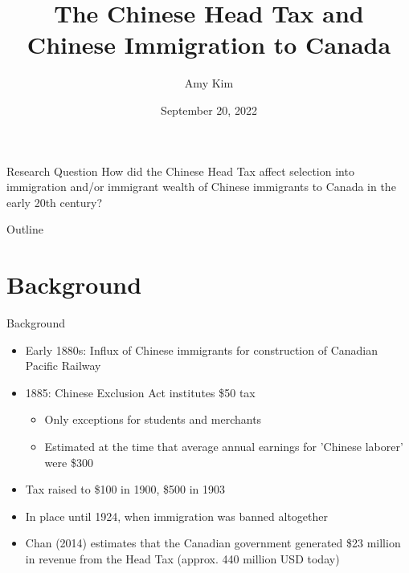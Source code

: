 \documentclass[pdf]{beamer}
\title{The Chinese Head Tax and Chinese Immigration to Canada}
\author{Amy Kim}
\date{September 20, 2022}
\begin{document}
\begin{frame}
    \titlepage
\end{frame}

\begin{frame}{Research Question}
    How did the Chinese Head Tax affect selection into immigration and/or immigrant wealth of Chinese immigrants to Canada in the early 20th century?    
\end{frame}

\begin{frame}{Outline}
    \tableofcontents
\end{frame}


\section{Background}
\begin{frame}{Background}
    \begin{itemize}
        \item Early 1880s: Influx of Chinese immigrants for construction of Canadian Pacific Railway
        \item 1885: Chinese Exclusion Act institutes \$50 tax
        \begin{itemize}
            \item Only exceptions for students and merchants
            \item Estimated at the time that average annual earnings for 'Chinese laborer' were \$300
        \end{itemize}
        \item Tax raised to \$100 in 1900, \$500 in 1903
        \item In place until 1924, when immigration was banned altogether
        \item Chan (2014) estimates that the Canadian government generated \$23 million in revenue from the Head Tax (approx. 440 million USD today)
    \end{itemize}
\end{frame}

\end{document}
